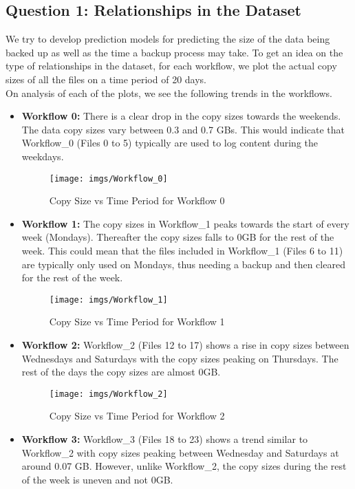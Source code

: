 \documentclass[letterpaper,twocolumn,10pt]{article}
\begin{document}
\subsection{Question 1: Relationships in the Dataset}
We try to develop prediction models for predicting the size of the data being backed up as well as the time a backup process may take. To get an idea on the type of relationships in the dataset, for each workflow, we plot the actual copy sizes of all the files on a time period of 20 days. 
\\
On analysis of each of the plots, we see the following trends in the workflows.
\begin{itemize}
\item\textbf{Workflow 0:} There is a clear drop in the copy sizes towards the weekends. The data copy sizes vary between 0.3 and 0.7 GBs. This would indicate that Workflow\_0 (Files 0 to 5) typically are used to log content during the weekdays. 
\begin{figure}[H]
  \texttt{[image: imgs/Workflow\_0]}
  \caption{Copy Size vs Time Period for Workflow 0}
  \label{fig:Workflow0}
\end{figure}
\item\textbf{Workflow 1:} The copy sizes in Workflow\_1 peaks towards the start of every week (Mondays). Thereafter the copy sizes falls to 0GB for the rest of the week. This could mean that the files included in Workflow\_1 (Files 6 to 11) are typically only used on Mondays, thus needing a backup and then cleared for the rest of the week.
\begin{figure}[H]
  \texttt{[image: imgs/Workflow\_1]}
  \caption{Copy Size vs Time Period for Workflow 1}
  \label{fig:Workflow1}
\end{figure}
\item\textbf{Workflow 2:} Workflow\_2 (Files 12 to 17) shows a rise in copy sizes between Wednesdays and Saturdays with the copy sizes peaking on Thursdays. The rest of the days the copy sizes are almost 0GB.
\begin{figure}[H]
  \texttt{[image: imgs/Workflow\_2]}
  \caption{Copy Size vs Time Period for Workflow 2}
  \label{fig:Workflow2}
\end{figure}
\item\textbf{Workflow 3:} Workflow\_3 (Files 18 to 23) shows a trend similar to Workflow\_2 with copy sizes peaking between Wednesday and Saturdays at around 0.07 GB. However, unlike Workflow\_2, the copy sizes during the rest of the week is uneven and not 0GB.

\end{itemize}
\end{document}
